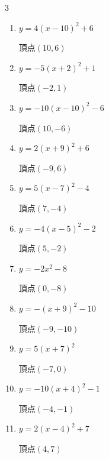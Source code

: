 \begin{multicols}{3}
\begin{enumerate}
        $\displaystyle 頂点\left( 0 , -9 \right)$

  \item $\displaystyle y=4\left( x-10\right)^{2}+6$

        $\displaystyle 頂点\left( 10 , 6 \right)$

  \item $\displaystyle y=-5\left( x+2\right)^{2}+1$

        $\displaystyle 頂点\left( -2 , 1 \right)$

  \item $\displaystyle y=-10\left( x-10\right)^{2}-6$

        $\displaystyle 頂点\left( 10 , -6 \right)$

  \item $\displaystyle y=2\left( x+9\right)^{2}+6$

        $\displaystyle 頂点\left( -9 , 6 \right)$

  \item $\displaystyle y=5\left( x-7\right)^{2}-4$

        $\displaystyle 頂点\left( 7 , -4 \right)$

  \item $\displaystyle y=-4\left( x-5\right)^{2}-2$

        $\displaystyle 頂点\left( 5 , -2 \right)$

  \item $\displaystyle y=-2x^{2}-8$

        $\displaystyle 頂点\left( 0 , -8 \right)$

  \item $\displaystyle y=-\left( x+9\right)^{2}-10$

        $\displaystyle 頂点\left( -9 , -10 \right)$

  \item $\displaystyle y=5\left( x+7\right)^{2}$

        $\displaystyle 頂点\left( -7 , 0 \right)$

  \item $\displaystyle y=-10\left( x+4\right)^{2}-1$

        $\displaystyle 頂点\left( -4 , -1 \right)$

\columnbreak %

  \item $\displaystyle y=2\left( x-4\right)^{2}+7$

        $\displaystyle 頂点\left( 4 , 7 \right)$


\end{enumerate}
\end{multicols}
